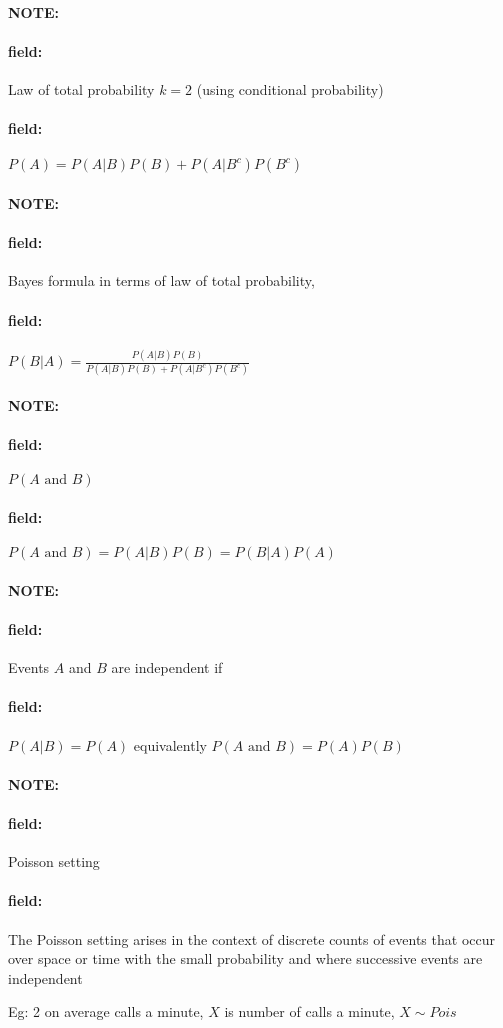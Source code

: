 \documentclass[12pt]{article}
\newenvironment{note}{\paragraph{NOTE:}}{}
\newenvironment{field}{\paragraph{field:}}{}
\begin{document}


\begin{note}
  \begin{field}
    Law of total probability $k=2$ (using conditional probability)
  \end{field}
  \begin{field}
    $P(A) = P(A|B)P(B) + P(A|B^c)P(B^c)$

  \end{field}
\end{note}

\begin{note}
  \begin{field}
    Bayes formula in terms of law of total probability,
  \end{field}
  \begin{field}
    $P(B|A) = \frac{P(A|B)P(B)}{P(A|B)P(B) + P(A|B^c)P(B^c)}$
  \end{field}
\end{note}

\begin{note}
  \begin{field}
    $P(A \text{ and }B)$
  \end{field}
  \begin{field}
    $P(A \text{ and }B) = P(A|B)P(B) = P(B|A)P(A)$
  \end{field}
\end{note}



\begin{note}
  \begin{field}
    Events $A$ and $B$ are independent if
  \end{field}
  \begin{field}
    $P(A|B) = P(A)$ equivalently $P(A \text{ and } B)  = P(A)P(B)$
  \end{field}
\end{note}

\begin{note}
  \begin{field}
    Poisson setting
  \end{field}
  \begin{field}
    The Poisson setting arises in the context of discrete counts of events that occur over space or time with the small probability and where successive events are independent

    Eg: 2 on average calls a minute, $X$ is number of calls a minute, $X \sim Pois $
  \end{field}
\end{note}
\end{document}
